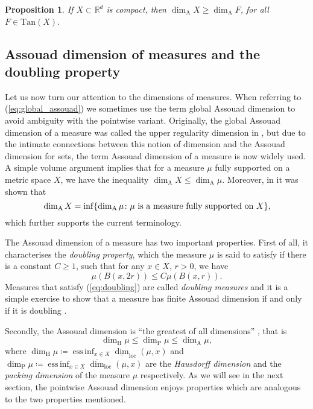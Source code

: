 \documentclass{PRM}
\newcommand{\field}[1]{\mathbb{#1}}
\newcommand{\R}{\field{R}}
\newcommand{\updim}{\overline{\dim}}
\newcommand{\lowdim}{\underline{\dim}}
\newcommand{\adim}{\dim_{\mathrm{A}}}
\DeclareMathOperator*{\essinf}{ess\,inf}
\theoremstyle{plain}
\newtheorem{prop}[thm]{Proposition}
\theoremstyle{definition}
\theoremstyle{remark}
\begin{document}
\begin{prop}\label{prop:weaktangent}
If $X\subset \R^d$ is compact, then $\dim_{\mathrm{A}} X\geq \dim_{\mathrm{A}}F$, for all $F\in\mathrm{Tan}(X)$.
\end{prop}

\subsection{Assouad dimension of measures and the doubling property}\label{subsec:assouad}
Let us now turn our attention to the dimensions of measures. When referring to (\ref{eq:global_assouad}) we sometimes use the term global Assouad dimension to avoid ambiguity with the pointwise variant. Originally, the global Assouad dimension of a measure was called the upper regularity dimension in \cite{KLV}, but due to the intimate connections between this notion of dimension and the Assouad dimension for sets, the term Assouad dimension of a measure is now widely used. A simple volume argument implies that for a measure $\mu$ fully supported on a metric space $X$, we have the inequality $\adim X\leq \adim\mu$. Moreover, in \cite{VK, LS} it was shown that
\begin{equation*}
    \adim X=\inf\{\adim\mu\colon \mu\textnormal{ is a measure fully supported on }X\},
\end{equation*}
which further supports the current terminology.

The Assouad dimension of a measure has two important properties. First of all, it characterises the \emph{doubling property}, which the measure $\mu$ is said to satisfy if there is a constant $C\geq 1$, such that for any $x\in X$, $r>0$, we have
\begin{equation}\label{eq:doubling}
    \mu(B(x,2r))\leq C\mu(B(x,r)).
\end{equation}
Measures that satisfy (\ref{eq:doubling}) are called \emph{doubling measures} and it is a simple exercise to show that a measure has finite Assouad dimension if and only if it is doubling \cite[Lemma 4.1.1]{F}.

Secondly, the Assouad dimension is ``the greatest of all dimensions'' \cite{F}, that is
\begin{equation*}
    \dim_{\mathrm{H}}\mu\leq \dim_{\mathrm{P}}\mu\leq\adim\mu,
\end{equation*}
where $\dim_{\mathrm{H}}\mu\coloneqq\essinf_{x\in X}\lowdim_{\mathrm{loc}}(\mu,x)$ and $\dim_{\mathrm{P}}\mu\coloneqq\essinf_{x\in X}\updim_{\mathrm{loc}}(\mu,x)$ are the \emph{Hausdorff dimension} and the \emph{packing dimension} of the measure $\mu$ respectively. As we will see in the next section, the pointwise Assouad dimension enjoys properties which are analogous to the two properties mentioned.
\end{document}
